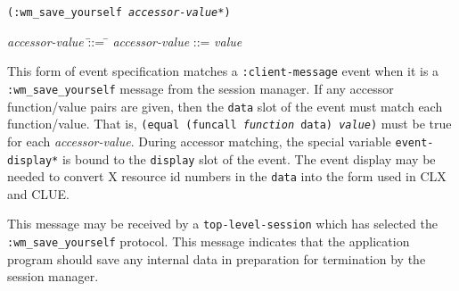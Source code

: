 {\samepage
{}
{\tt (:wm\_save\_yourself {\em accessor-value}*)}\\
\hspace*{.75in}
\parbox[t]{5.75in}{
\begin{tabbing}
{\em accessor-value} \= ::= \= \kill
{\em accessor-value} \>::=  {\em value} \\
\end{tabbing}}
}
\begin{flushright}
\parbox[t]{5.75in}{
This
form of event specification matches a {\tt :client-message}
event when it is a {\tt :wm\_save\_yourself} message from the session manager.
If
any accessor function/value pairs are
given, then the {\tt data} slot of the event must
match each function/value. That is, {\tt (equal (funcall {\em function}
data) {\em value})} must be true for each {\em accessor-value}.
During accessor matching, the special variable {\tt *event-display*} is
bound to the {\tt display} slot of the event. The event display may be
needed to convert X resource id numbers in the {\tt data} into the form
used in CLX and CLUE.}

\parbox[t]{5.75in}{
This message may be received by a {\tt top-level-session} which has selected the 
{\tt :wm\_save\_yourself} protocol. This message indicates that the application
program should save any internal data in preparation for termination by the
session manager.}
\end{flushright}


